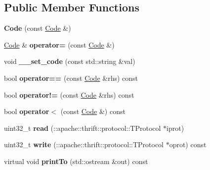 \subsection*{Public Member Functions}
\begin{DoxyCompactItemize}
\item 
\mbox{\label{classMARS_1_1Code_a0da16d905b467bce02e3d12afc28941a}} 
{\bfseries Code} (const \hyperlink{classMARS_1_1Code}{Code} \&)
\item 
\mbox{\label{classMARS_1_1Code_a804ba40d197d943f8763ae34a138e66c}} 
\hyperlink{classMARS_1_1Code}{Code} \& {\bfseries operator=} (const \hyperlink{classMARS_1_1Code}{Code} \&)
\item 
\mbox{\label{classMARS_1_1Code_a105c1d70af553f2115446fbdf5ea8eb8}} 
void {\bfseries \+\_\+\+\_\+set\+\_\+code} (const std\+::string \&val)
\item 
\mbox{\label{classMARS_1_1Code_a454b144403c876a6256c54e6042b5b37}} 
bool {\bfseries operator==} (const \hyperlink{classMARS_1_1Code}{Code} \&rhs) const
\item 
\mbox{\label{classMARS_1_1Code_aee6111f0a913c527b24029e70233a44a}} 
bool {\bfseries operator!=} (const \hyperlink{classMARS_1_1Code}{Code} \&rhs) const
\item 
\mbox{\label{classMARS_1_1Code_a528ce64bcde9095dda3d06309361bef4}} 
bool {\bfseries operator$<$} (const \hyperlink{classMARS_1_1Code}{Code} \&) const
\item 
\mbox{\label{classMARS_1_1Code_a9b78ec36f0e776506be23820c63021a8}} 
uint32\+\_\+t {\bfseries read} (\+::apache\+::thrift\+::protocol\+::\+T\+Protocol $\ast$iprot)
\item 
\mbox{\label{classMARS_1_1Code_a7729a8fdfae083d3dd74e9088b41a975}} 
uint32\+\_\+t {\bfseries write} (\+::apache\+::thrift\+::protocol\+::\+T\+Protocol $\ast$oprot) const
\item 
\mbox{\label{classMARS_1_1Code_ae3f0dd85af90fb7162a2e73e9a6ea3e2}} 
virtual void {\bfseries print\+To} (std\+::ostream \&out) const
\end{DoxyCompactItemize}
